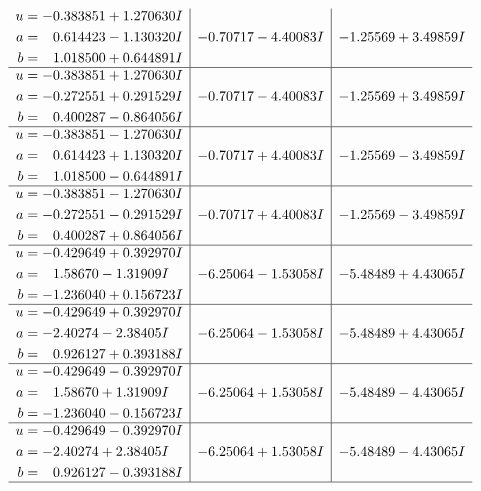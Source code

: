 \documentclass[1p]{elsarticle_modified}
\theoremstyle{definition}
\begin{document}
$$\begin{array}{c|c|c}
\begin{aligned}
u &= -0.383851 + 1.270630 I \\
a &= \phantom{-}0.614423 - 1.130320 I \\
b &= \phantom{-}1.018500 + 0.644891 I\end{aligned}
 & -0.70717 - 4.40083 I & -1.25569 + 3.49859 I \\ \hline\begin{aligned}
u &= -0.383851 + 1.270630 I \\
a &= -0.272551 + 0.291529 I \\
b &= \phantom{-}0.400287 - 0.864056 I\end{aligned}
 & -0.70717 - 4.40083 I & -1.25569 + 3.49859 I \\ \hline\begin{aligned}
u &= -0.383851 - 1.270630 I \\
a &= \phantom{-}0.614423 + 1.130320 I \\
b &= \phantom{-}1.018500 - 0.644891 I\end{aligned}
 & -0.70717 + 4.40083 I & -1.25569 - 3.49859 I \\ \hline\begin{aligned}
u &= -0.383851 - 1.270630 I \\
a &= -0.272551 - 0.291529 I \\
b &= \phantom{-}0.400287 + 0.864056 I\end{aligned}
 & -0.70717 + 4.40083 I & -1.25569 - 3.49859 I \\ \hline\begin{aligned}
u &= -0.429649 + 0.392970 I \\
a &= \phantom{-}1.58670 - 1.31909 I \\
b &= -1.236040 + 0.156723 I\end{aligned}
 & -6.25064 - 1.53058 I & -5.48489 + 4.43065 I \\ \hline\begin{aligned}
u &= -0.429649 + 0.392970 I \\
a &= -2.40274 - 2.38405 I \\
b &= \phantom{-}0.926127 + 0.393188 I\end{aligned}
 & -6.25064 - 1.53058 I & -5.48489 + 4.43065 I \\ \hline\begin{aligned}
u &= -0.429649 - 0.392970 I \\
a &= \phantom{-}1.58670 + 1.31909 I \\
b &= -1.236040 - 0.156723 I\end{aligned}
 & -6.25064 + 1.53058 I & -5.48489 - 4.43065 I \\ \hline\begin{aligned}
u &= -0.429649 - 0.392970 I \\
a &= -2.40274 + 2.38405 I \\
b &= \phantom{-}0.926127 - 0.393188 I\end{aligned}
 & -6.25064 + 1.53058 I & -5.48489 - 4.43065 I\\
 \hline 
 \end{array}$$\newpage\newpage\renewcommand{\arraystretch}{1}
\end{document}
